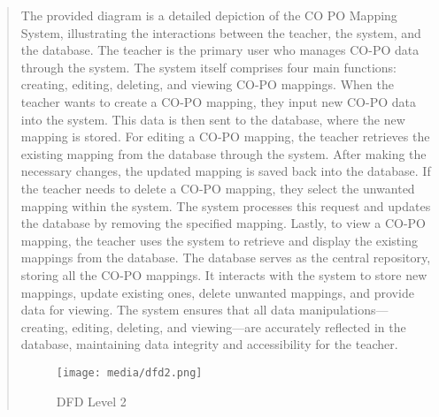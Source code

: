 \documentclass[12pt]{report}
\begin{document}
\begin{quote}
		\hspace{1cm}The provided diagram is a detailed depiction of the CO PO Mapping System, illustrating the interactions between the teacher, the system, and the database. The teacher is the primary user who manages CO-PO data through the system. The system itself comprises four main functions: creating, editing, deleting, and viewing CO-PO mappings.
		When the teacher wants to create a CO-PO mapping, they input new CO-PO data into the system. This data is then sent to the database, where the new mapping is stored. For editing a CO-PO mapping, the teacher retrieves the existing mapping from the database through the system. After making the necessary changes, the updated mapping is saved back into the database.
		If the teacher needs to delete a CO-PO mapping, they select the unwanted mapping within the system. The system processes this request and updates the database by removing the specified mapping. Lastly, to view a CO-PO mapping, the teacher uses the system to retrieve and display the existing mappings from the database.
		The database serves as the central repository, storing all the CO-PO mappings. It interacts with the system to store new mappings, update existing ones, delete unwanted mappings, and provide data for viewing. The system ensures that all data manipulations—creating, editing, deleting, and viewing—are accurately reflected in the database, maintaining data integrity and accessibility for the teacher.
		
		\begin{figure}
			\centering
			\texttt{[image: media/dfd2.png]}\\
			\caption{DFD Level 2}
		\end{figure}
		\clearpage
		

\end{quote}
\end{document}
